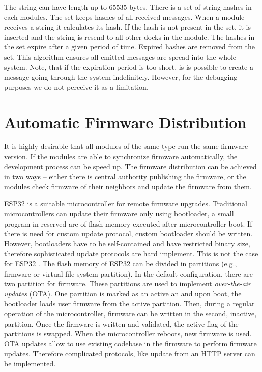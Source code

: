 \noindent The string can have length up to 65535 bytes. There is a set of string
hashes in each modules. The set keeps hashes of all received messages. When a
module receives a string it calculates its hash. If the hash is not present in
the set, it is inserted and the string is resend to all other docks in the
module. The hashes in the set expire after a given period of time. Expired
hashes are removed from the set. This algorithm ensures all emitted messages are
spread into the whole system. Note, that if the expiration period is too short,
is is possible to create a message going through the system indefinitely.
However, for the debugging purposes we do not perceive it as a limitation.

\section{Automatic Firmware Distribution} \label{sec:firmware_distribution}

It is highly desirable that all modules of the same type run the same firmware
version. If the modules are able to synchronize firmware automatically, the
development process can be speed up. The firmware distribution can be achieved
in two ways -- either there is central authority publishing the firmware, or the
modules check firmware of their neighbors and update the firmware from them.

ESP32 is a suitable microcontroller for remote firmware upgrades. Traditional
microcontrollers can update their firmware only using bootloader, a small
program in reserved are of flash memory executed after microcontroller boot. If
there is need for custom update protocol, custom bootloader should be written.
However, bootloaders have to be self-contained and have restricted binary size,
therefore sophisticated update protocols are hard implement. This is not the
case for ESP32 \cite{noauthor_esp-idf_nodate}. The flash memory of ESP32 can be
divided in partitions (e.g., firmware or virtual file system partition). In the
default configuration, there are two partition for firmware. These partitions
are used to implement \emph{over-the-air updates} (OTA). One partition is marked
as an active an and upon boot, the bootloader loads user firmware from the
active partition. Then, during a regular operation of the microcontroller,
firmware can be written in the second, inactive, partition. Once the firmware is
written and validated, the active flag of the partitions is swapped. When the
microcontroller reboots, new firmware is used. OTA updates allow to use existing
codebase in the firmware to perform firmware updates. Therefore complicated
protocols, like update from an HTTP server can be implemented.

